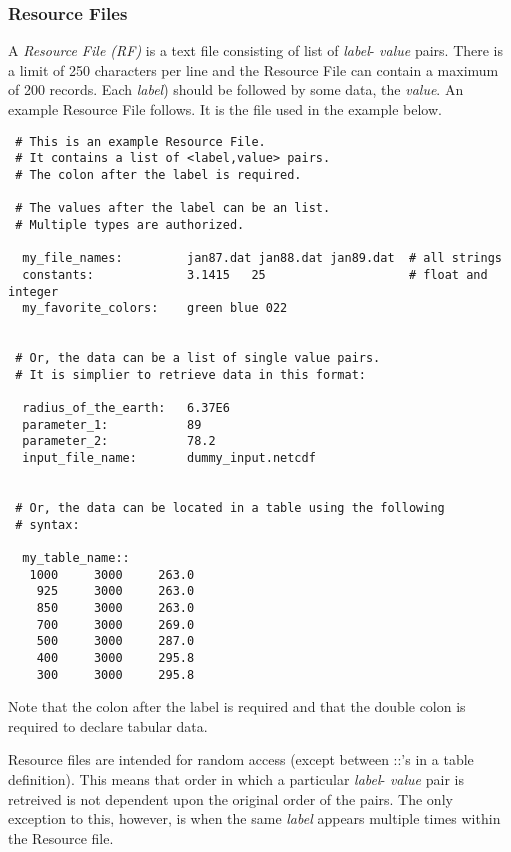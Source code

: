 
 \subsubsection{Resource Files}

   A {\em Resource File (RF)} is a text file consisting of list of {\em label}- 
   {\em value} pairs. There is a limit of 250 characters per line and the Resource 
   File can contain a maximum of 200 records. Each {\em label}) should be followed 
   by some data, the {\em value}. 
   An example Resource File follows.  It is the file used in the example below. 

 \begin{verbatim}
 # This is an example Resource File.  
 # It contains a list of <label,value> pairs.
 # The colon after the label is required. 

 # The values after the label can be an list.
 # Multiple types are authorized.
  
  my_file_names:         jan87.dat jan88.dat jan89.dat  # all strings
  constants:             3.1415   25                    # float and integer
  my_favorite_colors:    green blue 022               


 # Or, the data can be a list of single value pairs. 
 # It is simplier to retrieve data in this format:

  radius_of_the_earth:   6.37E6         
  parameter_1:           89
  parameter_2:           78.2
  input_file_name:       dummy_input.netcdf 


 # Or, the data can be located in a table using the following
 # syntax:

  my_table_name::
   1000     3000     263.0
    925     3000     263.0
    850     3000     263.0
    700     3000     269.0
    500     3000     287.0
    400     3000     295.8
    300     3000     295.8

 \end{verbatim}
 Note that the colon after the label is required and that the double colon is required
 to declare tabular data. 

 Resource files are intended for random access (except between ::'s in a 
 table definition). This means that order in which a particular {\em label}- 
 {\em value} pair is retreived is not dependent upon the original order 
 of the pairs. The only exception to this, however, is when the same {\em label} appears 
 multiple times within the Resource file.




